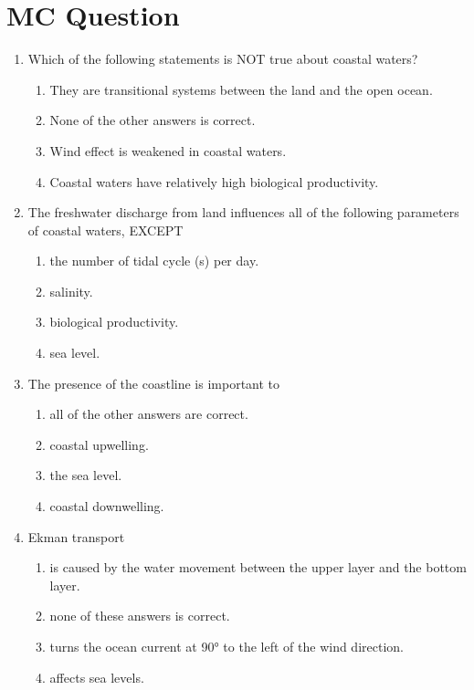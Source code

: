 \documentclass{report}
\begin{document}
\section{MC Question}
\begin{enumerate}
    \item Which of the following statements is NOT true about coastal waters?
    \begin{enumerate}
        \item   They are transitional systems between the land and the open ocean. 
        \item   None of the other answers is correct. 
        \item   Wind effect is weakened in coastal waters. 
        \item   Coastal waters have relatively high biological productivity. 
    \end{enumerate}
    \item The freshwater discharge from land influences all of the following parameters of coastal waters, EXCEPT
    \begin{enumerate}
        \item   the number of tidal cycle (s) per day. 
        \item   salinity. 
        \item   biological productivity. 
        \item   sea level. 
    \end{enumerate}
    \item The presence of the coastline is important to
    \begin{enumerate}
        \item   all of the other answers are correct. 
        \item   coastal upwelling. 
        \item   the sea level. 
        \item   coastal downwelling. 
    \end{enumerate}
    \item Ekman transport
    \begin{enumerate}
        \item   is caused by the water movement between the upper layer and the bottom layer.
        \item   none of these answers is correct. 
        \item   turns the ocean current at 90° to the left of the wind direction. 
        \item   affects sea levels. 
    \end{enumerate}

\end{enumerate}
\end{document}
